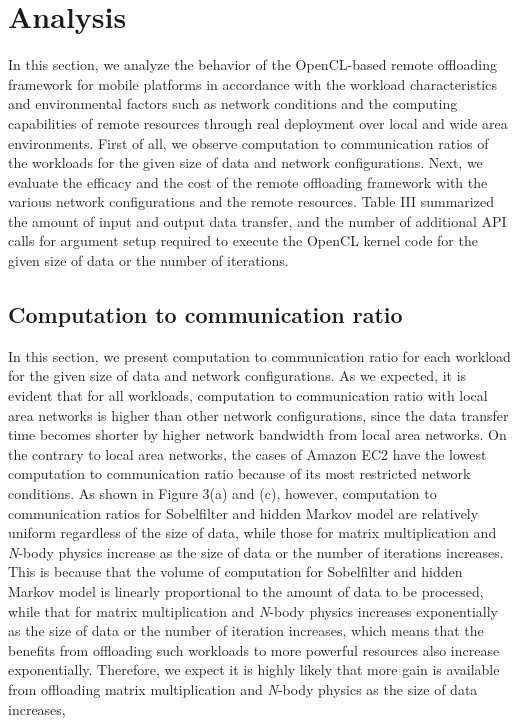 \documentclass[conference]{IEEEtran}
\begin{document}
\section{Analysis}
In this section, we analyze the behavior of the OpenCL-based remote
offloading framework for mobile platforms in accordance with the
workload characteristics and environmental factors such as network
conditions and the computing capabilities of remote resources through
real deployment over local and wide area environments.
%
First of all, we observe computation to communication ratios of the
workloads for the given size of data and network configurations.
%
Next, we evaluate the efficacy and the cost of the remote offloading
framework with the various network configurations and the remote
resources.
%
Table III summarized the amount of input and output data transfer, and the number
of additional API calls for argument setup required to execute the
OpenCL kernel code for the given size of data or the number of
iterations.
%
\subsection{Computation to communication ratio}
In this section, we present computation to communication ratio 
for each workload for the given size of data and network configurations.
%
As we expected, it is evident that for all workloads, computation to communication
ratio with local area networks is higher than other network
configurations, since the data transfer time becomes shorter by higher
network bandwidth from local area networks.
%
On the contrary to local area networks, the cases of Amazon EC2 have the
lowest computation to communication ratio because of its most restricted
network conditions.
%
As shown in Figure 3(a) and (c), however, computation to communication ratios 
for Sobelfilter and hidden Markov model are relatively uniform
regardless of the size of data, while those for matrix multiplication
and \textit{N}-body physics increase as the size of data or the
number of iterations increases. 
%
This is because that the volume of computation for Sobelfilter and
hidden Markov model is linearly proportional to the amount of data to be
processed, while that for matrix multiplication and
\textit{N}-body physics increases exponentially as the size of data or
the number of iteration increases, which means that the benefits from
offloading such workloads to more powerful resources also increase exponentially.
%
%
Therefore, we expect it is highly likely that more gain is available
from offloading matrix multiplication and \textit{N}-body physics 
as the size of data increases,   
%
\end{document}
